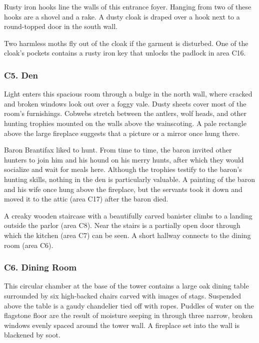 \documentclass[10pt,a4paper,twoside,bg=print,twocolumn,openany,nodeprecatedcode]{dndbook}
\begin{document}
\begin{DndReadAloud}{}
Rusty iron hooks line the walls of this entrance foyer. Hanging from two of these hooks are a shovel and a rake. A dusty cloak is draped over a hook next to a round-topped door in the south wall. 

\end{DndReadAloud}

Two harmless moths fly out of the cloak if the garment is disturbed. One of the cloak's pockets contains a rusty iron key that unlocks the padlock in area C16.

\subsubsection{C5. Den}
\begin{DndReadAloud}{}
Light enters this spacious room through a bulge in the north wall, where cracked and broken windows look out over a foggy vale. Dusty sheets cover most of the room's furnishings. Cobwebs stretch between the antlers, wolf heads, and other hunting trophies mounted on the walls above the wainscoting. A pale rectangle above the large fireplace suggests that a picture or a mirror once hung there. 

\end{DndReadAloud}

Baron Brantifax liked to hunt. From time to time, the baron invited other hunters to join him and his hound on his merry hunts, after which they would socialize and wait for meals here. Although the trophies testify to the baron's hunting skills, nothing in the den is particularly valuable. A painting of the baron and his wife once hung above the fireplace, but the servants took it down and moved it to the attic (area C17) after the baron died.

A creaky wooden staircase with a beautifully carved banister climbs to a landing outside the parlor (area C8). Near the stairs is a partially open door through which the kitchen (area C7) can be seen. A short hallway connects to the dining room (area C6).

\subsubsection{C6. Dining Room}
\begin{DndReadAloud}{}
This circular chamber at the base of the tower contains a large oak dining table surrounded by six high-backed chairs carved with images of stags. Suspended above the table is a gaudy chandelier tied off with ropes. Puddles of water on the flagstone floor are the result of moisture seeping in through three narrow, broken windows evenly spaced around the tower wall. A fireplace set into the wall is blackened by soot. 

\end{DndReadAloud}
\end{document}
